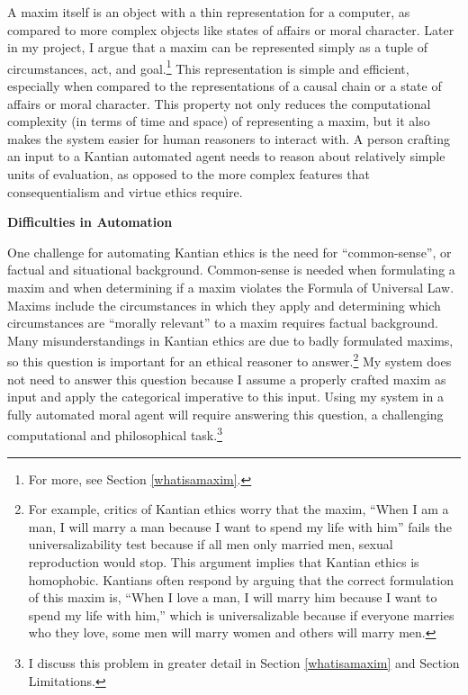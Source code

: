 \begin{isabellebody}
\begin{isamarkuptext}
A maxim itself is an object with a thin representation for a computer, as compared to more complex 
objects like states of affairs or moral character. Later in my project, I argue that a maxim can be 
represented simply as a tuple of circumstances, act, and goal.\footnote{For more, see Section \ref{whatisamaxim}.} 
This representation is simple and efficient, especially when compared to the representations of a causal 
chain or a state of affairs or moral character. This property not only reduces the computational complexity
(in terms of time and space) of representing a maxim, but it also makes the system easier for human reasoners
to interact with. A person crafting an input to a Kantian automated agent needs to reason about relatively
simple units of evaluation, as opposed to the more complex features that consequentialism and virtue
ethics require.%
\end{isamarkuptext}\isamarkuptrue%
%
\begin{isamarkuptext}%
\noindent \textbf{Difficulties in Automation}%
\end{isamarkuptext}\isamarkuptrue%
%
\begin{isamarkuptext}%
One challenge for automating Kantian ethics is the need for ``common-sense'', or factual and 
situational background. Common-sense is needed when formulating a maxim and when determining if a maxim 
violates the Formula of Universal Law. Maxims include the circumstances in which they apply and
determining which circumstances are ``morally relevant'' to a maxim requires factual background. 
Many misunderstandings in Kantian ethics are due to badly formulated maxims, so this question is 
important for an ethical reasoner to answer.\footnote{For example, critics of Kantian ethics worry 
that the maxim, ``When I am a
man, I will marry a man because I want to spend my life with him'' fails the universalizability
test because if all men only married men, sexual reproduction would stop. This argument implies 
that Kantian ethics is homophobic. Kantians often respond by arguing that the correct formulation of 
this maxim is, ``When I love a man, I will marry him because I want to spend my life with him,'' which
is universalizable because if everyone marries who they love, some men will marry women and others will
marry men.} My system does not need to answer this question because I assume a properly crafted
maxim as input and apply the categorical imperative to this input. Using my system in a fully automated
moral agent will require answering this question, a challenging computational and philosophical task.\footnote{I
discuss this problem in greater detail in Section \ref{whatisamaxim} and Section Limitations.} 


\end{isamarkuptext}
\end{isabellebody}
